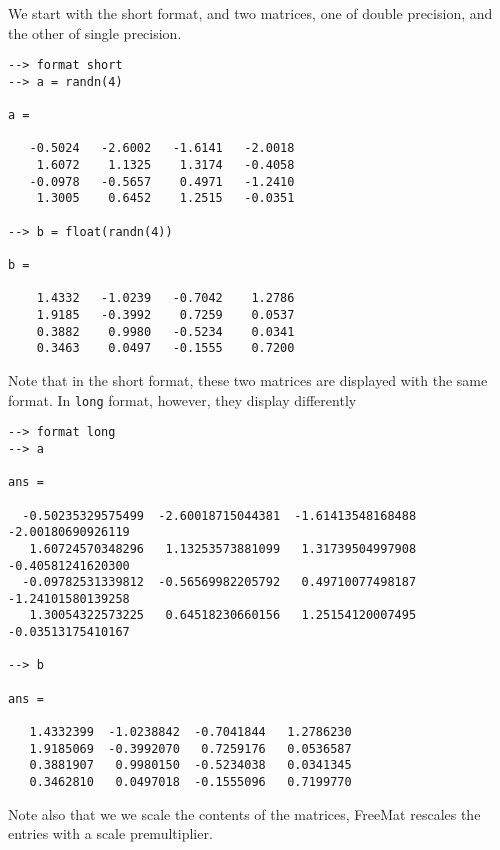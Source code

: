 We start with the short format, and two matrices, one of double precision, and the
other of single precision.
\begin{verbatim}
--> format short
--> a = randn(4)

a = 

   -0.5024   -2.6002   -1.6141   -2.0018 
    1.6072    1.1325    1.3174   -0.4058 
   -0.0978   -0.5657    0.4971   -1.2410 
    1.3005    0.6452    1.2515   -0.0351 

--> b = float(randn(4))

b = 

    1.4332   -1.0239   -0.7042    1.2786 
    1.9185   -0.3992    0.7259    0.0537 
    0.3882    0.9980   -0.5234    0.0341 
    0.3463    0.0497   -0.1555    0.7200 
\end{verbatim}
Note that in the short format, these two matrices are displayed with the same format.
In \verb|long| format, however, they display differently
\begin{verbatim}
--> format long
--> a

ans = 

  -0.50235329575499  -2.60018715044381  -1.61413548168488  -2.00180690926119 
   1.60724570348296   1.13253573881099   1.31739504997908  -0.40581241620300 
  -0.09782531339812  -0.56569982205792   0.49710077498187  -1.24101580139258 
   1.30054322573225   0.64518230660156   1.25154120007495  -0.03513175410167 

--> b

ans = 

   1.4332399  -1.0238842  -0.7041844   1.2786230 
   1.9185069  -0.3992070   0.7259176   0.0536587 
   0.3881907   0.9980150  -0.5234038   0.0341345 
   0.3462810   0.0497018  -0.1555096   0.7199770 
\end{verbatim}
Note also that we we scale the contents of the matrices, FreeMat rescales the entries
with a scale premultiplier.
